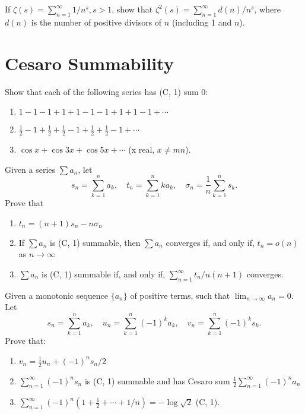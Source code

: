\begin{problembox}
If \(\zeta(s) = \sum_{n=1}^{\infty} 1/n^s, s > 1\), show that \(\zeta^2(s) = \sum_{n=1}^{\infty} d(n) / n^s\), where \(d(n)\) is the number of positive divisors of \(n\) (including 1 and \(n\)).
\end{problembox}

\section{Cesaro Summability}

\begin{problembox}
Show that each of the following series has (C, 1) sum 0:
\begin{enumerate}[label=\alph*)]
\item \(1 - 1 - 1 + 1 + 1 - 1 - 1 + 1 + 1 - 1 + \cdots\)
\item \(\frac{1}{2} - 1 + \frac{1}{2} + \frac{1}{2} - 1 + \frac{1}{2} + \frac{1}{2} - 1 + \cdots\)
\item \(\cos x + \cos 3x + \cos 5x + \cdots\) (x real, \(x \neq mn\)).
\end{enumerate}
\end{problembox}

\begin{problembox}
Given a series \(\sum a_n\), let
\[s_n = \sum_{k=1}^{n} a_k, \quad t_n = \sum_{k=1}^{n} k a_k, \quad \sigma_n = \frac{1}{n} \sum_{k=1}^{n} s_k.\]
Prove that
\begin{enumerate}[label=\alph*)]
\item \(t_n = (n + 1)s_n - n\sigma_n\)
\item If \(\sum a_n\) is (C, 1) summable, then \(\sum a_n\) converges if, and only if, \(t_n = o(n)\) as \(n \to \infty\)
\item \(\sum a_n\) is (C, 1) summable if, and only if, \(\sum_{n=1}^{\infty} t_n / n(n + 1)\) converges.
\end{enumerate}
\end{problembox}

\begin{problembox}
Given a monotonic sequence \(\{a_n\}\) of positive terms, such that \(\lim_{n \to \infty} a_n = 0\). Let
\[s_n = \sum_{k=1}^{n} a_k, \quad u_n = \sum_{k=1}^{n} (-1)^k a_k, \quad v_n = \sum_{k=1}^{n} (-1)^k s_k.\]
Prove that:
\begin{enumerate}[label=\alph*)]
\item \(v_n = \frac{1}{2} u_n + (-1)^n s_n / 2\)
\item \(\sum_{n=1}^{\infty} (-1)^n s_n\) is (C, 1) summable and has Cesaro sum \(\frac{1}{2} \sum_{n=1}^{\infty} (-1)^n a_n\)
\item \(\sum_{n=1}^{\infty} (-1)^n (1 + \frac{1}{2} + \cdots + 1/n) = -\log \sqrt{2}\) (C, 1).
\end{enumerate}
\end{problembox}

